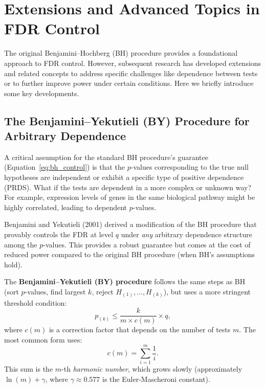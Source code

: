 \documentclass[12pt]{book}
\newcommand{\pvalue}{$p$-value}          %
\begin{document}
\chapter{Extensions and Advanced Topics in FDR Control}
\label{chap:extensions}

The original Benjamini–Hochberg (BH) procedure provides a foundational approach to FDR control. However, subsequent research has developed extensions and related concepts to address specific challenges like dependence between tests or to further improve power under certain conditions. Here we briefly introduce some key developments.

\section{The Benjamini–Yekutieli (BY) Procedure for Arbitrary Dependence}
A critical assumption for the standard BH procedure's guarantee (Equation~\ref{eq:bh_control}) is that the \pvalue s corresponding to the true null hypotheses are independent or exhibit a specific type of positive dependence (PRDS). What if the tests are dependent in a more complex or unknown way? For example, expression levels of genes in the same biological pathway might be highly correlated, leading to dependent \pvalue s.

Benjamini and Yekutieli (2001) derived a modification of the BH procedure that provably controls the FDR at level $q$ under \emph{any} arbitrary dependence structure among the \pvalue s. This provides a robust guarantee but comes at the cost of reduced power compared to the original BH procedure (when BH's assumptions hold).

The \textbf{Benjamini–Yekutieli (BY) procedure} follows the same steps as BH (sort \pvalue s, find largest $k$, reject $H_{(1)}, \dots, H_{(k)}$), but uses a more stringent threshold condition:
\begin{equation}
  p_{(k)} \le \frac{k}{m \times c(m)} \times q, \label{eq:by_condition}
\end{equation}
where $c(m)$ is a correction factor that depends on the number of tests $m$. The most common form uses:
\begin{equation}
  c(m) = \sum_{i=1}^{m} \frac{1}{i}.
\end{equation}
This sum is the $m$-th \emph{harmonic number}, which grows slowly (approximately $\ln(m) + \gamma$, where $\gamma \approx 0.577$ is the Euler-Mascheroni constant).
\end{document}

